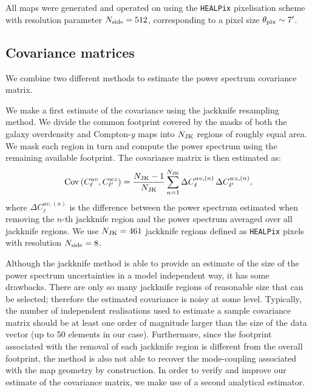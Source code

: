 \documentclass[useAMS,usenatbib]{mn2e}
\begin{document}
    All maps were generated and operated on using the {\tt HEALPix} pixelisation scheme \citep{2005ApJ...622..759G} with resolution parameter $N_{\rm side}=512$, corresponding to a pixel size $\theta_{\rm pix}\sim7'$.

  \subsection{Covariance matrices}\label{ssec:methods.cov}
    We combine two different methods to estimate the power spectrum covariance matrix. 
    
    We make a first estimate of the covariance using the jackknife resampling method. We divide the common footprint covered by the masks of both the galaxy overdensity and Compton-$y$ maps into $N_{\rm JK}$ regions of roughly equal area. We mask each region in turn and compute the power spectrum  using the remaining available footprint. The covariance matrix is then estimated as:
    \begin{equation}\label{eq:cov_jk}
      {\rm Cov}\left(C^{uv}_\ell,C^{wz}_{\ell'}\right)=\frac{N_{\rm JK}-1}{N_{\rm JK}}\sum_{n=1}^{N_{\rm JK}}\Delta C^{uv,(n)}_\ell\,\Delta C^{wz,(n)}_{\ell'},
    \end{equation}
    where $\Delta C^{uv,(n)}_\ell$ is the difference between the power spectrum estimated when removing the $n$-th jackknife region and the power spectrum averaged over all jackknife regions. We use $N_{\rm JK}=461$ jackknife regions defined as {\tt HEALPix} pixels with resolution $N_{\rm side}=8$.

    Although the jackknife method is able to provide an estimate of the size of the power spectrum uncertainties in a model independent way, it has some drawbacks. There are only so many jackknife regions of reasonable size that can be selected; therefore the estimated covariance is noisy at some level. Typically, the number of independent realisations used to estimate a sample covariance matrix should be at least one order of magnitude larger than the size of the data vector (up to 50 elements in our case). Furthermore, since the footprint associated with the removal of each jackknife region is different from the overall footprint, the method is also not able to recover the mode-coupling associated with the map geometry by construction. In order to verify and improve our estimate of the covariance matrix, we make use of a second analytical estimator.
\end{document}
